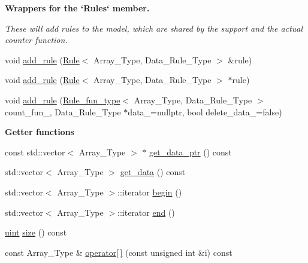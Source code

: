 \begin{Indent}\textbf{ Wrappers for the `\+Rules` member.}\par
{\em These will add rules to the model, which are shared by the support and the actual counter function. }\begin{DoxyCompactItemize}
\item 
void \hyperlink{classbarry_1_1_power_set_a00ee318a40da91bcf0bff79bf71454ab}{add\+\_\+rule} (\hyperlink{classbarry_1_1_rule}{Rule}$<$ Array\+\_\+\+Type, Data\+\_\+\+Rule\+\_\+\+Type $>$ \&rule)
\item 
void \hyperlink{classbarry_1_1_power_set_a6cb8fb8f09b4c190e2ac6c07daa1241e}{add\+\_\+rule} (\hyperlink{classbarry_1_1_rule}{Rule}$<$ Array\+\_\+\+Type, Data\+\_\+\+Rule\+\_\+\+Type $>$ $\ast$rule)
\item 
void \hyperlink{classbarry_1_1_power_set_aae5eae12186fff037efa3884ac2b3dcc}{add\+\_\+rule} (\hyperlink{namespacebarry_a3b914cb0dafdd5e5c19d142e8fa96c92}{Rule\+\_\+fun\+\_\+type}$<$ Array\+\_\+\+Type, Data\+\_\+\+Rule\+\_\+\+Type $>$ count\+\_\+fun\+\_\+, Data\+\_\+\+Rule\+\_\+\+Type $\ast$data\+\_\+=nullptr, bool delete\+\_\+data\+\_\+=false)
\end{DoxyCompactItemize}
\end{Indent}
\begin{Indent}\textbf{ Getter functions}\par
\begin{DoxyCompactItemize}
\item 
const std\+::vector$<$ Array\+\_\+\+Type $>$ $\ast$ \hyperlink{classbarry_1_1_power_set_a80b283b1ac115f1be049a09f1a69586a}{get\+\_\+data\+\_\+ptr} () const
\item 
std\+::vector$<$ Array\+\_\+\+Type $>$ \hyperlink{classbarry_1_1_power_set_a53ca37c9cb14abd6f61bc0127ac9d067}{get\+\_\+data} () const
\item 
std\+::vector$<$ Array\+\_\+\+Type $>$\+::iterator \hyperlink{classbarry_1_1_power_set_a0db34800ac228a47917cc9f3e08a88a9}{begin} ()
\item 
std\+::vector$<$ Array\+\_\+\+Type $>$\+::iterator \hyperlink{classbarry_1_1_power_set_a1fb01ffc52e39a831058c480e981da9e}{end} ()
\item 
\hyperlink{namespacebarry_a11dfc53ddb4672278319aa04f1e09a6c}{uint} \hyperlink{classbarry_1_1_power_set_af8b336d7b958c44bb69cd24d7a462ed8}{size} () const
\item 
const Array\+\_\+\+Type \& \hyperlink{classbarry_1_1_power_set_a8da3f3a278b35999f232cb9f9312b0cc}{operator\mbox{[}$\,$\mbox{]}} (const unsigned int \&i) const
\end{DoxyCompactItemize}
\end{Indent}
